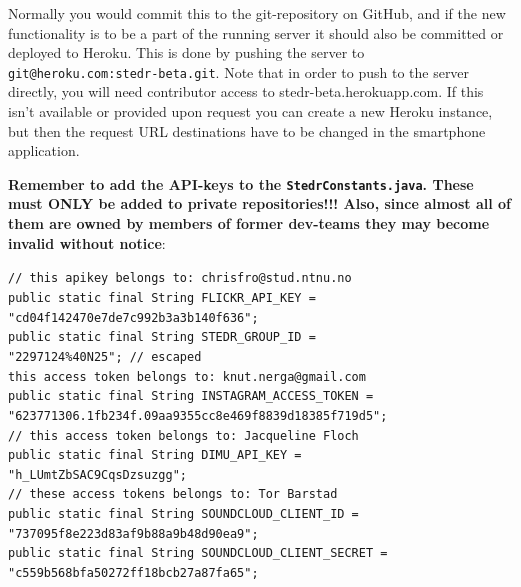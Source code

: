 Normally you would commit this to the git-repository on GitHub, and if the new functionality is to be a part of the running server it should also be committed or deployed to Heroku. This is done by pushing the server to \texttt{git@heroku.com:stedr-beta.git}. Note that in order to push to the server directly, you will need contributor access to stedr-beta.herokuapp.com. If this isn't available or provided upon request you can create a new Heroku instance, but then the request URL destinations have to be changed in the smartphone application.

\textbf{Remember to add the API-keys to the \texttt{StedrConstants.java}. These must ONLY be added to private repositories!!! Also, since almost all of them are owned by members of former dev-teams they may become invalid without notice}:


\texttt{// this apikey belongs to: chrisfro@stud.ntnu.no} \\
\texttt{public static final String FLICKR\_API\_KEY = } \\
\hspace*{4em}\texttt{"cd04f142470e7de7c992b3a3b140f636";} \\
\texttt{public static final String STEDR\_GROUP\_ID =} \\ 
\hspace*{4em}\texttt{"2297124\%40N25"; // escaped} \\
\texttt{this access token belongs to: knut.nerga@gmail.com} \\
\texttt{public static final String INSTAGRAM\_ACCESS\_TOKEN =} \\ 
\hspace*{4em}\texttt{"623771306.1fb234f.09aa9355cc8e469f8839d18385f719d5";} \\
\texttt{// this access token belongs to: Jacqueline Floch} \\
\texttt{public static final String DIMU\_API\_KEY =} \\ 
\hspace*{4em}\texttt{"h\_LUmtZbSAC9CqsDzsuzgg";} \\
\texttt{// these access tokens belongs to: Tor Barstad} \\
\texttt{public static final String SOUNDCLOUD\_CLIENT\_ID =} \\ 
\hspace*{4em}\texttt{"737095f8e223d83af9b88a9b48d90ea9";} \\
\texttt{public static final String SOUNDCLOUD\_CLIENT\_SECRET =} \\ 
\hspace*{4em}\texttt{"c559b568bfa50272ff18bcb27a87fa65";} \\


